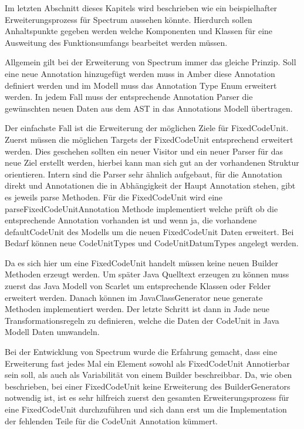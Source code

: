 \documentclass[12pt,oneside,a4paper,parskip]{scrbook}
\begin{document}
Im letzten Abschnitt dieses Kapitels wird beschrieben wie ein beispielhafter Erweiterungsprozess für Spectrum aussehen könnte. Hierdurch sollen Anhaltspunkte gegeben werden welche Komponenten und Klassen für eine Ausweitung des Funktionsumfangs bearbeitet werden müssen.

Allgemein gilt bei der Erweiterung von Spectrum immer das gleiche Prinzip. Soll eine neue Annotation hinzugefügt werden muss in Amber diese Annotation definiert werden und im Modell muss das Annotation Type Enum erweitert werden. In jedem Fall muss der entsprechende Annotation Parser die gewünschten neuen Daten aus dem AST in das Annotations Modell übertragen. 

Der einfachste Fall ist die Erweiterung der möglichen Ziele für FixedCodeUnit. Zuerst müssen die möglichen Targets der FixedCodeUnit entsprechend erweitert werden. Dies geschehen sollten ein neuer Visitor und ein neuer Parser für das neue Ziel erstellt werden, hierbei kann man sich gut an der vorhandenen Struktur orientieren. Intern sind die Parser sehr ähnlich aufgebaut, für die Annotation direkt und Annotationen die in Abhängigkeit der Haupt Annotation stehen, gibt es jeweils parse Methoden. Für die FixedCodeUnit wird eine parseFixedCodeUnitAnnotation Methode implementiert welche prüft ob die entsprechende Annotation vorhanden ist und wenn ja, die vorhandene defaultCodeUnit des Modells um die neuen FixedCodeUnit Daten erweitert. Bei Bedarf können neue CodeUnitTypes und CodeUnitDatumTypes angelegt werden. 

Da es sich hier um eine FixedCodeUnit handelt müssen keine neuen Builder Methoden erzeugt werden. Um später Java Quelltext erzeugen zu können muss zuerst das Java Modell von Scarlet um entsprechende Klassen oder Felder erweitert werden. Danach können im JavaClassGenerator neue generate Methoden implementiert werden. Der letzte Schritt ist dann in Jade neue Transformationsregeln zu definieren, welche die Daten der CodeUnit in Java Modell Daten umwandeln.

Bei der Entwicklung von Spectrum wurde die Erfahrung gemacht, dass eine Erweiterung fast jedes Mal ein Element sowohl als FixedCodeUnit Annotierbar sein soll, als auch als Variabilität von einem Builder beschreibbar. Da, wie oben beschrieben, bei einer FixedCodeUnit keine Erweiterung des BuilderGenerators notwendig ist, ist es sehr hilfreich zuerst den gesamten Erweiterungsprozess für eine FixedCodeUnit durchzuführen und sich dann erst um die Implementation der fehlenden Teile für die CodeUnit Annotation kümmert.
\end{document}
